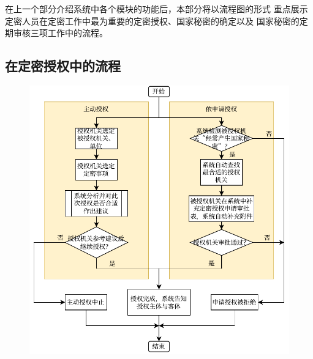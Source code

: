 在上一个部分介绍系统中各个模块的功能后，本部分将以流程图的形式
重点展示定密人员在定密工作中最为重要的定密授权、国家秘密的确定以及
国家秘密的定期审核三项工作中的流程。

\subsection{在定密授权中的流程}
\begin{figure}[H]
    \centering
    \includegraphics[width=\textwidth]{figure/授权}
\end{figure}

